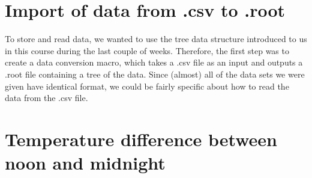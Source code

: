 
\section*{Import of data from .csv to .root}
To store and read data, we wanted to use the tree data structure introduced to us in this course during the last couple of weeks. Therefore, the first step was to create a data conversion macro, which takes a .csv file as an input and outputs a .root file containing a tree of the data. Since (almost) all of the data sets we were given have identical format, we could be fairly specific about how to read the data from the .csv file.

\section*{Temperature difference between noon and midnight}
